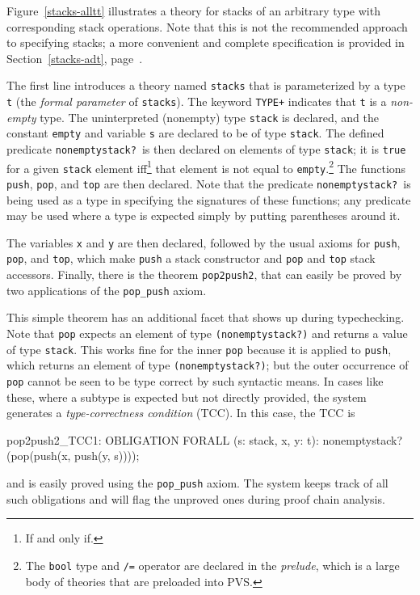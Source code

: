 Figure~\ref{stacks-alltt} illustrates a theory for stacks of an arbitrary
type with corresponding stack operations.  Note that this is not the
recommended approach to specifying stacks; a more convenient and complete
specification is provided in Section~\ref{stacks-adt},
page~\pageref{stacks-adt}.

The first line introduces a theory named \texttt{stacks} that is
parameterized by a type \texttt{t} (the \emph{formal parameter} of
\texttt{stacks}).  The keyword \texttt{TYPE+} indicates that \texttt{t} is
a \emph{non-empty} type.  The uninterpreted (nonempty) type \texttt{stack}
is declared, and the constant \texttt{empty} and variable \texttt{s} are
declared to be of type \texttt{stack}.  The defined predicate
\texttt{nonemptystack?}~is then declared on elements of type
\texttt{stack}; it is \texttt{true} for a given \texttt{stack} element
iff\footnote{If and only if.} that element is not equal to
\texttt{empty}.\footnote{The \texttt{bool} type and \texttt{/=} operator
are declared in the \emph{prelude}, which is a large body of theories that
are preloaded into PVS.  %
}
The functions \texttt{push}, \texttt{pop}, and \texttt{top} are then
declared.  Note that the predicate \texttt{nonemptystack?}~is being used
as a type in specifying the signatures of these functions; any predicate
may be used where a type is expected simply by putting parentheses around
it.

The variables \texttt{x} and \texttt{y} are then declared, followed by the
usual axioms for \texttt{push}, \texttt{pop}, and \texttt{top}, which make
\texttt{push} a stack constructor and \texttt{pop} and \texttt{top} stack
accessors.  Finally, there is the theorem \texttt{pop2push2}, that can
easily be proved by two applications of the \texttt{pop\_push} axiom.

This simple theorem has an additional facet that shows up during
typechecking.  Note that \texttt{pop} expects an element of type
\texttt{(nonemptystack?)} and returns a value of type \texttt{stack}.
This works fine for the inner \texttt{pop} because it is applied to
\texttt{push}, which returns an element of type \texttt{(nonemptystack?)};
but the outer occurrence of \texttt{pop} cannot be seen to be type correct
by such syntactic means.  In cases like these, where a subtype is expected
but not directly provided, the system generates a \emph{type-correctness
condition} (TCC).  In this case, the TCC is
\begin{pvsex}
  pop2push2_TCC1: OBLIGATION
    FORALL (s: stack, x, y: t): nonemptystack?(pop(push(x, push(y, s))));
\end{pvsex}
and is easily proved using the \texttt{pop\_push} axiom.  The system keeps
track of all such obligations and will flag the unproved ones during proof
chain analysis.

